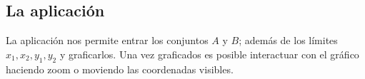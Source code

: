 \subsection{La aplicación}

La aplicación nos permite entrar los conjuntos $A$ y $B$; además de los límites $x_1, x_2, y_1, y_2$ y graficarlos. Una vez graficados es posible interactuar con el gráfico haciendo zoom o moviendo las coordenadas visibles.
